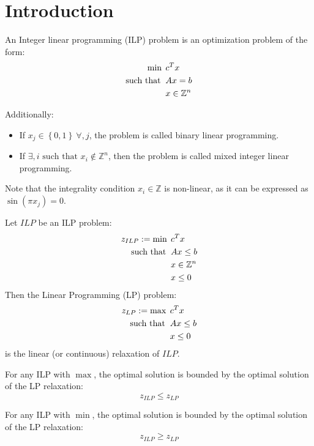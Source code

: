 \section{Introduction}

\begin{definition}
    An Integer linear programming (ILP) problem is an optimization problem of the form:
    \begin{align*}
        \min                      \:&\: c^Tx           \\
        \textnormal{such that }     &\: Ax = b         \\
                                    &\: x \in \mathbb{Z}^n
    \end{align*}  
\end{definition}
Additionally:
\begin{itemize}
  \item If $x_j \in \left\{ 0, 1 \right\} \: \forall, j$, the problem is called binary linear programming.
  \item If $\exists, i \text{ such that }x_i \notin \mathbb{Z}^n$, then the problem is called mixed integer linear programming.
\end{itemize}
Note that the integrality condition $x_i \in \mathbb{Z}$ is non-linear, as it can be expressed as $\sin(\pi x_j)=0$.
\begin{definition}
    Let $ILP$ be an ILP problem:
    \begin{align*}
        z_{ILP}:=\min                      \:&\: c^Tx           \\
        \textnormal{such that }     &\: Ax \leq b               \\
                                    &\: x \in \mathbb{Z}^n      \\
                                    &\: x \leq 0
    \end{align*}  
    Then the Linear Programming (LP) problem:
    \begin{align*}
        z_{LP}:=\max                      \:&\: c^Tx                    \\
        \textnormal{such that }             &\: Ax \leq b               \\
                                            &\: x \leq 0
    \end{align*}  
    is the linear (or continuous) relaxation of $ILP$.
\end{definition}
\begin{property}  
    For any ILP with $\max$, the optimal solution is bounded by the optimal solution of the LP relaxation:
    \[ z_{ILP} \leq z_{LP} \]
  
    For any ILP with $\min$, the optimal solution is bounded by the optimal solution of the LP relaxation:
    \[ z_{ILP} \geq z_{LP} \]
\end{property}
